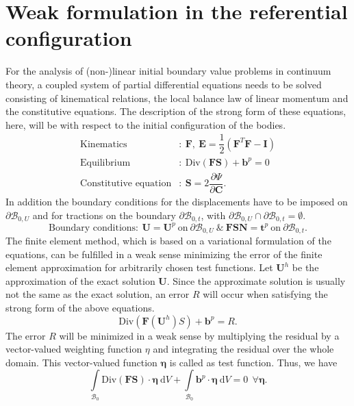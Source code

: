 \documentclass[11pt,a4paper,final]{article}
\begin{document}
\section{Weak formulation in the referential configuration}
For the analysis of (non-)linear initial boundary value problems in continuum theory, a coupled system of partial differential equations needs to be solved consisting of kinematical relations, the local balance law of linear momentum and the constitutive equations. The description of the strong form of these equations, here, will be with respect to the initial configuration of the bodies. 
\begin{align*}
\text{Kinematics}&: \ \mathbf{F}, \ \mathbf{E} = \dfrac{1}{2} (\mathbf{F}^T \mathbf{F} - \mathbf{I}) \\
\text{Equilibrium}&: \ \text{Div}(\mathbf{F S}) + \mathbf{b}^p = 0 \\
\text{Constitutive equation}&: \ \mathbf{S} = 2\dfrac{\partial \Psi}{\partial \mathbf{C}}.
\end{align*}
In addition the boundary conditions for the displacements have to be imposed on $\partial \mathcal{B}_{0,U}$ and for tractions on the boundary $\partial \mathcal{B}_{0,t}$, with $\partial \mathcal{B}_{0,U} \cap \partial \mathcal{B}_{0,t} = \emptyset$.
\begin{equation*}
\text{Boundary conditions} : \ \mathbf{U} = \mathbf{U}^p \ \text{on} \ \partial \mathcal{B}_{0,U} \ \& \ \mathbf{F S N} = \mathbf{t}^p \ \text{on} \ \partial \mathcal{B}_{0,t}.
\end{equation*}
The finite element method, which is based on a variational formulation of the equations, can be fulfilled in a weak sense minimizing the error of the finite element approximation for arbitrarily chosen test functions. Let $\mathbf{U}^h$ be the approximation of the exact solution $\mathbf{U}$. Since the approximate solution is usually not the same as the exact solution, an error $R$ will occur when satisfying the strong form of the above equations.
\begin{equation}
\text{Div}(\mathbf{F}(\mathbf{U}^h) S) + \mathbf{b}^p = R.
\end{equation}
The error $R$ will be minimized in a weak sense by multiplying the residual by a vector-valued weighting function $\eta$ and integrating the residual over the whole domain. This vector-valued function $\bm{\eta}$ is called as test function. Thus, we have
\begin{equation}
\int\limits_{\mathcal{B}_0} \text{Div}(\mathbf{F S}) \cdot \bm{\eta} \ \mathrm{d}V + \int\limits_{\mathcal{B}_0} \mathbf{b}^p \cdot \bm{\eta} \ \mathrm{d}V = 0 \ \ \forall \bm{\eta}.
\label{eq:1.7}
\end{equation}
\end{document}
